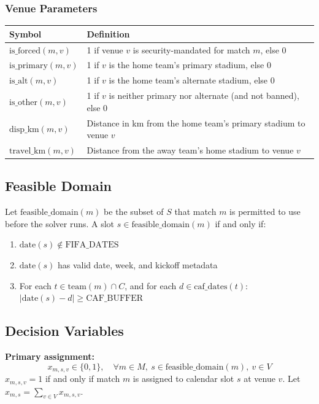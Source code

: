 \documentclass[a4paper,11pt]{article}
\begin{document}
\subsubsection{Venue Parameters}
\begin{table}[h!]
\centering
\begin{tabularx}{\textwidth}{l X}
\toprule
\textbf{Symbol} & \textbf{Definition} \\
\midrule
$\text{is\_forced}(m,v)$ & 1 if venue $v$ is security-mandated for match $m$, else 0 \\
$\text{is\_primary}(m,v)$ & 1 if $v$ is the home team’s primary stadium, else 0 \\
$\text{is\_alt}(m,v)$ & 1 if $v$ is the home team’s alternate stadium, else 0 \\
$\text{is\_other}(m,v)$ & 1 if $v$ is neither primary nor alternate (and not banned), else 0 \\
$\text{disp\_km}(m,v)$ & Distance in km from the home team’s primary stadium to venue $v$ \\
$\text{travel\_km}(m,v)$ & Distance from the away team’s home stadium to venue $v$ \\
\bottomrule
\end{tabularx}
\end{table}

\subsection{Feasible Domain}
Let $\text{feasible\_domain}(m)$ be the subset of $S$ that match $m$ is permitted to use before the solver runs. A slot $s \in \text{feasible\_domain}(m)$ if and only if:
\begin{enumerate}
    \item $\text{date}(s) \notin \text{FIFA\_DATES}$
    \item $\text{date}(s)$ has valid date, week, and kickoff metadata
    \item For each $t \in \text{team}(m) \cap C$, and for each $d \in \text{caf\_dates}(t)$:
    $|\text{date}(s) - d| \ge \text{CAF\_BUFFER}$
\end{enumerate}

\subsection{Decision Variables}
\textbf{Primary assignment:}
\begin{equation}
x_{m,s,v} \in \{0, 1\}, \quad \forall m \in M, \ s \in \text{feasible\_domain}(m), \ v \in V
\end{equation}
$x_{m,s,v} = 1$ if and only if match $m$ is assigned to calendar slot $s$ at venue $v$. Let $x_{m,s} = \sum_{v \in V} x_{m,s,v}$.
\end{document}
